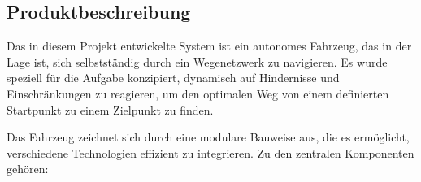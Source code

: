 \documentclass[main.tex]{subfiles} %
\begin{document}

\subsection{Produktbeschreibung}

Das in diesem Projekt entwickelte System ist ein autonomes Fahrzeug, das in der
Lage ist, sich selbstständig durch ein Wegenetzwerk zu navigieren. Es wurde
speziell für die Aufgabe konzipiert, dynamisch auf Hindernisse und
Einschränkungen zu reagieren, um den optimalen Weg von einem definierten
Startpunkt zu einem Zielpunkt zu finden.

Das Fahrzeug zeichnet sich durch eine modulare Bauweise aus, die es ermöglicht,
verschiedene Technologien effizient zu integrieren. Zu den zentralen
Komponenten gehören:
\end{document}
